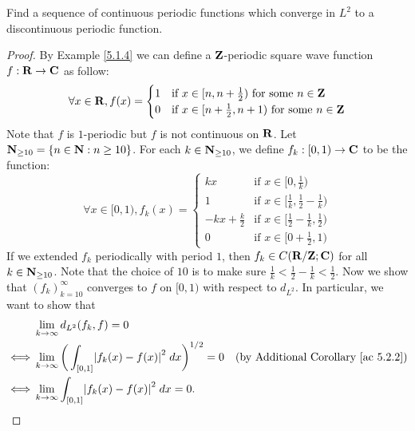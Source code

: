 \begin{exercise}\label{ex 5.2.5}
    Find a sequence of continuous periodic functions which converge in \(L^2\) to a discontinuous periodic function.
\end{exercise}

\begin{proof}
    By Example \ref{5.1.4} we can define a \(\mathbf{Z}\)-periodic square wave function \(f : \mathbf{R} \to \mathbf{C}\) as follow:
    \[
        \forall x \in \mathbf{R}, f(x) = \begin{cases}
            1 & \text{if } x \in [n, n + \frac{1}{2}) \text{ for some } n \in \mathbf{Z}     \\
            0 & \text{if } x \in [n + \frac{1}{2}, n + 1) \text{ for some } n \in \mathbf{Z}
        \end{cases}
    \]
    Note that \(f\) is \(1\)-periodic but \(f\) is not continuous on \(\mathbf{R}\).
    Let \(\mathbf{N}_{\geq 10} = \{n \in \mathbf{N} : n \geq 10\}\).
    For each \(k \in \mathbf{N}_{\geq 10}\), we define \(f_k : [0, 1) \to \mathbf{C}\) to be the function:
    \[
        \forall x \in [0, 1), f_k(x) = \begin{cases}
            kx                & \text{if } x \in [0, \frac{1}{k})                         \\
            1                 & \text{if } x \in [\frac{1}{k}, \frac{1}{2} - \frac{1}{k}) \\
            -kx + \frac{k}{2} & \text{if } x \in [\frac{1}{2} - \frac{1}{k}, \frac{1}{2}) \\
            0                 & \text{if } x \in [0 + \frac{1}{2}, 1)
        \end{cases}
    \]
    If we extended \(f_k\) periodically with period \(1\), then \(f_k \in C(\mathbf{R} / \mathbf{Z} ; \mathbf{C})\) for all \(k \in \mathbf{N}_{\geq 10}\).
    Note that the choice of \(10\) is to make sure \(\frac{1}{k} < \frac{1}{2} - \frac{1}{k} < \frac{1}{2}\).
    Now we show that \((f_k)_{k = 10}^\infty\) converges to \(f\) on \([0, 1)\) with respect to \(d_{L^2}\).
    In particular, we want to show that
    \begin{align*}
             & \lim_{k \to \infty} d_{L^2}(f_k, f) = 0                                                                                                 \\
        \iff & \lim_{k \to \infty} \bigg(\int_{[0, 1]} \abs{f_k(x) - f(x)}^2 \; dx\bigg)^{1 / 2} = 0 & \text{(by Additional Corollary \ref{ac 5.2.2})} \\
        \iff & \lim_{k \to \infty} \int_{[0, 1]} \abs{f_k(x) - f(x)}^2 \; dx = 0.
    \end{align*}

\end{proof}
